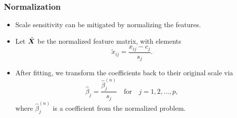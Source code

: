 \documentclass[aspectratio=1610,onlytextwidth]{beamer}
\begin{document}
\begin{frame}[c]
  \frametitle{Normalization}

  \begin{itemize}[<+->]
    \item Scale sensitivity can be mitigated by normalizing the features.
    \item Let \(\tilde{\boldsymbol X}\) be the normalized feature matrix, with elements
          \[
            \tilde{x}_{ij} = \frac{x_{ij} - c_{j}}{s_j}.
          \]
    \item After fitting, we transform the coefficients back to their original scale via
          \[
            \hat\beta_j = \frac{\hat\beta^{(n)}_j}{s_j} \quad\text{for}\quad j = 1,2,\dots,p,
          \]
          where \(\hat\beta^{(n)}_j\) is a coefficient from the normalized problem.
  \end{itemize}

\end{frame}
\end{document}
